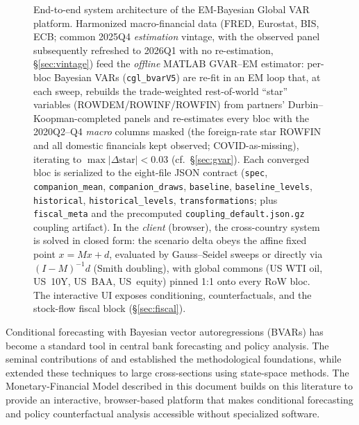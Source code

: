 \documentclass[11pt]{article}
\theoremstyle{definition}
\theoremstyle{remark}
\begin{document}
\begin{figure}[!ht]
{%
}
\caption[End-to-end system architecture]{End-to-end system architecture of the EM-Bayesian Global VAR platform.
Harmonized macro-financial data (FRED, Eurostat, BIS, ECB; common 2025Q4 \emph{estimation} vintage, with
the observed panel subsequently refreshed to 2026Q1 with no re-estimation, \S\ref{sec:vintage}) feed the
\emph{offline} MATLAB GVAR--EM estimator: per-bloc Bayesian VARs (\texttt{cgl\_bvarV5}) are re-fit in an
EM loop that, at each sweep, rebuilds the trade-weighted rest-of-world ``star'' variables
(ROWDEM/ROWINF/ROWFIN) from partners' Durbin--Koopman-completed panels and re-estimates every bloc with
the 2020Q2--Q4 \emph{macro} columns masked (the foreign-rate star ROWFIN and all domestic financials kept
observed; COVID-as-missing), iterating to $\max|\Delta\text{star}|<0.03$ (cf.\ \S\ref{sec:gvar}). Each
converged bloc is serialized to the eight-file JSON contract (\texttt{spec}, \texttt{companion\_mean},
\texttt{companion\_draws}, \texttt{baseline}, \texttt{baseline\_levels}, \texttt{historical},
\texttt{historical\_levels}, \texttt{transformations}; plus \texttt{fiscal\_meta} and the precomputed
\texttt{coupling\_default.json.gz} coupling artifact). In the \emph{client} (browser), the cross-country
system is solved in closed form: the scenario delta obeys the affine fixed point $x = Mx + d$, evaluated by
Gauss--Seidel sweeps or directly via $(I-M)^{-1}d$ (Smith doubling), with global commons (US WTI oil,
US~10Y, US~BAA, US~equity) pinned 1:1 onto every RoW bloc. The interactive UI exposes conditioning,
counterfactuals, and the stock-flow fiscal block (\S\ref{sec:fiscal}).}
\label{fig:architecture}
\end{figure}

Conditional forecasting with Bayesian vector autoregressions (BVARs)
has become a standard tool in central bank forecasting and policy
analysis.  The seminal contributions of
\citet{DoanLittermanSims1984} and \citet{WaggonerZha1999}
established the methodological foundations, while
\citet{BanburaGiannoneLenza2015} extended these techniques to large
cross-sections using state-space methods.  The Monetary-Financial
Model described in this document builds on this literature to provide an
interactive, browser-based platform that makes conditional forecasting
and policy counterfactual analysis accessible without specialized
software.
\end{document}
